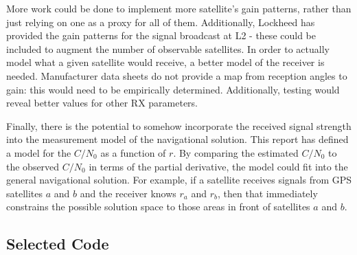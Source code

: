 \documentclass[11pt]{article}
\newcommand{\cnr}{C/N_0}
\begin{document}
More work could be done to implement more satellite's gain patterns, rather than just relying on one as a proxy for all of them. Additionally, Lockheed has provided the gain patterns for the signal broadcast at L2 - these could be included to augment the number of observable satellites. In order to actually model what a given satellite would receive, a better model of the receiver is needed. Manufacturer data sheets do not provide a map from reception angles to gain: this would need to be empirically determined. Additionally, testing would reveal better values for other RX parameters.

Finally, there is the potential to somehow incorporate the received signal strength into the measurement model of the navigational solution. This report has defined a model for the $\cnr$ as a function of $r$. By comparing the estimated $\cnr$ to the observed $\cnr$ in terms of the partial derivative, the model could fit into the general navigational solution. For example, if a satellite receives signals from GPS satellites $a$ and $b$ and the receiver knows $r_a$ and $r_b$, then that immediately constrains the possible solution space to those areas in front of satellites $a$ and $b$. 

\pagebreak

\begin{appendices}
\section{Selected Code}







  
\end{appendices} 
\end{document}
